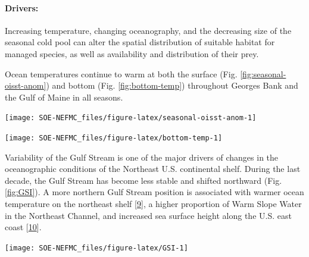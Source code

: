 \documentclass[
  10pt,
]{article}
\let\origfigure\figure
\let\endorigfigure\endfigure
\renewenvironment{figure}[1][2] {
    \expandafter\origfigure\expandafter[H]
} {
    \endorigfigure
}
\begin{document}
\hypertarget{drivers}{%
\paragraph{Drivers:}\label{drivers}}

Increasing temperature, changing oceanography, and the decreasing size of the seasonal cold pool can alter the spatial distribution of suitable habitat for managed species, as well as availability and distribution of their prey.

Ocean temperatures continue to warm at both the surface (Fig. \ref{fig:seasonal-oisst-anom}) and bottom (Fig. \ref{fig:bottom-temp}) throughout Georges Bank and the Gulf of Maine in all seasons.

\begin{figure}

{\centering \texttt{[image: SOE-NEFMC\_files/figure-latex/seasonal-oisst-anom-1]} 

}

\caption{GB and GOM seasonal sea surface temperature (SST) time series . Seasons are defined as: Jan-Mar for winter, Apr-Jun for spring, Jul-Sep for summer, and Oct-Dec for fall.}\label{fig:seasonal-oisst-anom}
\end{figure}

\begin{figure}

{\centering \texttt{[image: SOE-NEFMC\_files/figure-latex/bottom-temp-1]} 

}

\caption{MAB seasonal bottom temperature (BT) anomaly time series. Seasons are defined as: Jan-Mar for winter, Apr-Jun for spring, Jul-Sep for summer, and Oct-Dec for fall.}\label{fig:bottom-temp}
\end{figure}

Variability of the Gulf Stream is one of the major drivers of changes in the oceanographic conditions of the Northeast U.S. continental shelf. During the last decade, the Gulf Stream has become less stable and shifted northward (Fig. \ref{fig:GSI}). A more northern Gulf Stream position is associated with warmer ocean temperature on the northeast shelf {[}\protect\hyperlink{ref-zhang_role_2007}{9}{]}, a higher proportion of Warm Slope Water in the Northeast Channel, and increased sea surface height along the U.S. east coast {[}\protect\hyperlink{ref-goddard_extreme_2015}{10}{]}.

\begin{figure}

{\centering \texttt{[image: SOE-NEFMC\_files/figure-latex/GSI-1]} 

}

\caption{Index representing changes in the location of the Gulf Stream north wall. Positive values represent a more northerly Gulf Stream position.}\label{fig:GSI}
\end{figure}
\end{document}

